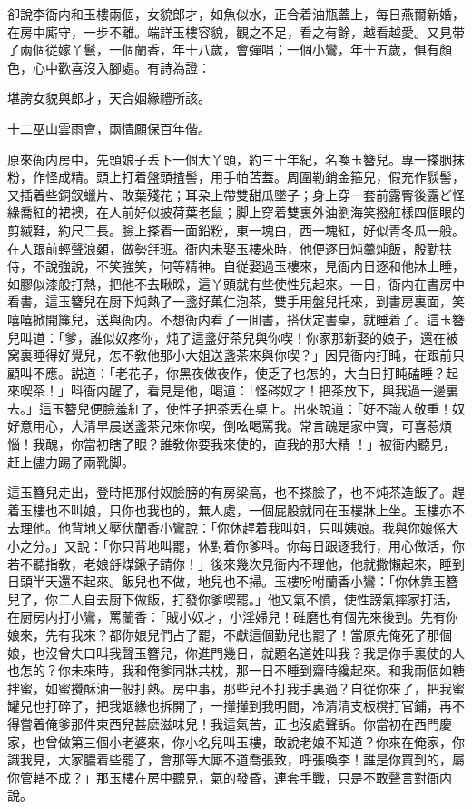 卻說李衙内和玉樓兩個，女貌郎才，如魚似水，正合着油瓶蓋上，每日燕爾新婚，在房中廝守，一步不離。端詳玉樓容貌，觀之不足，看之有餘，越看越愛。又見带了兩個従嫁丫鬟，一個蘭香，年十八歲，會彈唱；一個小鸞，年十五歲，俱有顏色，心中歡喜沒入腳處。有詩為證：

\begin{myquote}
堪誇女貌與郎才，天合姻緣禮所該。

十二巫山雲雨會，兩情願保百年偕。
\end{myquote}

原來衙内房中，先頭娘子丢下一個大丫頭，約三十年紀，名喚玉簪兒。專一搽胭抹粉，作怪成精。頭上打着盤頭揸髻，用手帕苫蓋。周圍勒銷金箍兒，假充作䯼髻，又插着些銅釵蠟片、敗葉殘花；耳朶上帶雙甜瓜墜子；身上穿一套前露臀後露ど怪綠喬紅的裙襖，在人前好似披荷葉老鼠；脚上穿着雙裏外油劉海笑撥舡樣四個眼的剪絨鞋，約尺二長。臉上搽着一面鉛粉，東一塊白，西一塊紅，好似青冬瓜一般。在人跟前輕聲浪顙，做勢㧱班。衙内未娶玉樓來時，他便逐日炖羹炖飯，殷勤扶侍，不說強說，不笑強笑，何等精神。自従娶過玉樓來，見衙内日逐和他牀上睡，如膠似漆般打熱，把他不去瞅睬，這丫頭就有些使性兒起來。一日，衙内在書房中看書，這玉簪兒在厨下炖熱了一盞好菓仁泡茶，雙手用盤兒托來，到書房裏面，笑嘻嘻掀開簾兒，送與衙内。不想衙内看了一囬書，搭伏定書桌，就睡着了。這玉簪兒叫道：「爹，誰似奴疼你，炖了這盞好茶兒與你喫！你家那新娶的娘子，還在被窝裏睡得好覺兒，怎不敎他那小大姐送盞茶來與你喫？」因見衙内打盹，在跟前只顧叫不應。説道：「老花子，你黑夜做夜作，使乏了也怎的，大白日打盹磕睡？起來喫茶！」呌衙内醒了，看見是他，喝道：「怪硶奴才！把茶放下，與我過一邊裏去。」這玉簪兒便臉羞紅了，使性子把茶丢在桌上。出來說道：「好不識人敬重！奴好意用心，大清早晨送盞茶兒來你喫，倒吆喝罵我。常言醜是家中寳，可喜惹煩惱！我醜，你當初瞎了眼？誰敎你要我來使的，直我的那大精𣭈！」被衙内聽見，赶上儘力踢了兩靴脚。

這玉簪兒走出，登時把那付奴臉膀的有房梁高，也不搽臉了，也不炖茶造飯了。趕着玉樓也不叫娘，只你也我也的，無人處，一個屁股就同在玉樓牀上坐。玉樓亦不去理他。他背地又壓伏蘭香小鸞說：「你休趕着我叫姐，只叫姨娘。我與你娘係大小之分。」又說：「你只背地叫罷，休對着你爹呌。你每日跟逐我行，用心做活，你若不聽指敎，老娘㧱煤鍬子請你！」後來幾次見衙内不理他，他就撒懶起來，睡到日頭半天還不起來。飯兒也不做，地兒也不掃。玉樓吩咐蘭香小鸞：「你休靠玉簪兒了，你二人自去厨下做飯，打發你爹喫罷。」他又氣不憤，使性謗氣摔家打活，在厨房内打小鸞，罵蘭香：「賊小奴才，小淫婦兒！碓磨也有個先來後到。先有你娘來，先有我來？都你娘兒們占了罷，不獻這個勤兒也罷了！當原先俺死了那個娘，也沒曾失口叫我聲玉簪兒，你進門幾日，就題名道姓叫我？我是你手裏使的人也怎的？你未來時，我和俺爹同牀共枕，那一日不睡到齋時纔起來。和我兩個如糖拌蜜，如蜜攪酥油一般打熱。房中事，那些兒不打我手裏過？自従你來了，把我蜜罐兒也打碎了，把我姻緣也拆開了，一攆攆到我明間，冷清清支板櫈打官鋪，再不得嘗着俺爹那件東西兒甚麽滋味兒！我這氣苦，正也沒處聲訴。你當初在西門慶家，也曾做第三個小老婆來，你小名兒叫玉樓，敢說老娘不知道？你來在俺家，你識我見，大家膿着些罷了，會那等大廝不道喬張致，呼張喚李！誰是你買到的，屬你管轄不成？」那玉樓在房中聽見，氣的發昏，連套手戰，只是不敢聲言對衙内說。

